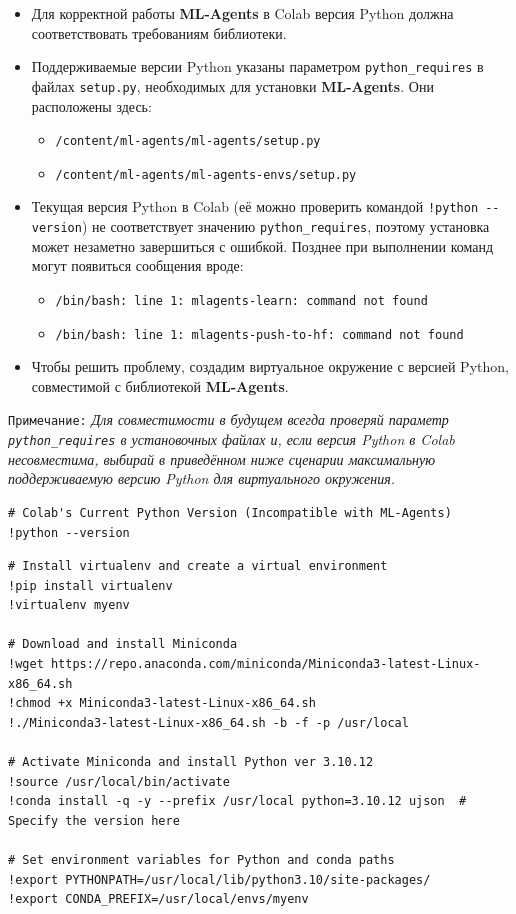\documentclass[11pt,a4paper]{article}
\begin{document}
\begin{itemize}
\item
  Для корректной работы \textbf{ML-Agents} в Colab версия Python должна соответствовать требованиям библиотеки.
\item
  Поддерживаемые версии Python указаны параметром \texttt{python\_requires} в файлах \texttt{setup.py}, необходимых для установки \textbf{ML-Agents}. Они расположены здесь:

  \begin{itemize}
  \tightlist
  \item
  \texttt{/content/ml-agents/ml-agents/setup.py}
  \item
  \texttt{/content/ml-agents/ml-agents-envs/setup.py}
  \end{itemize}
\item
  Текущая версия Python в Colab (её можно проверить командой \texttt{!python\ -\/-version}) не соответствует значению \texttt{python\_requires}, поэтому установка может незаметно завершиться с ошибкой. Позднее при выполнении команд могут появиться сообщения вроде:

  \begin{itemize}
  \tightlist
  \item
  \texttt{/bin/bash:\ line\ 1:\ mlagents-learn:\ command\ not\ found}
  \item
  \texttt{/bin/bash:\ line\ 1:\ mlagents-push-to-hf:\ command\ not\ found}
  \end{itemize}
\item
  Чтобы решить проблему, создадим виртуальное окружение с версией Python, совместимой с библиотекой \textbf{ML-Agents}.
\end{itemize}

\texttt{Примечание:} \emph{Для совместимости в будущем всегда проверяй параметр \texttt{python\_requires} в установочных файлах и, если версия Python в Colab несовместима, выбирай в приведённом ниже сценарии максимальную поддерживаемую версию Python для виртуального окружения.}

\begin{lstlisting}
# Colab's Current Python Version (Incompatible with ML-Agents)
!python --version
\end{lstlisting}

\begin{lstlisting}
# Install virtualenv and create a virtual environment
!pip install virtualenv
!virtualenv myenv

# Download and install Miniconda
!wget https://repo.anaconda.com/miniconda/Miniconda3-latest-Linux-x86_64.sh
!chmod +x Miniconda3-latest-Linux-x86_64.sh
!./Miniconda3-latest-Linux-x86_64.sh -b -f -p /usr/local

# Activate Miniconda and install Python ver 3.10.12
!source /usr/local/bin/activate
!conda install -q -y --prefix /usr/local python=3.10.12 ujson  # Specify the version here

# Set environment variables for Python and conda paths
!export PYTHONPATH=/usr/local/lib/python3.10/site-packages/
!export CONDA_PREFIX=/usr/local/envs/myenv
\end{lstlisting}
\end{document}
